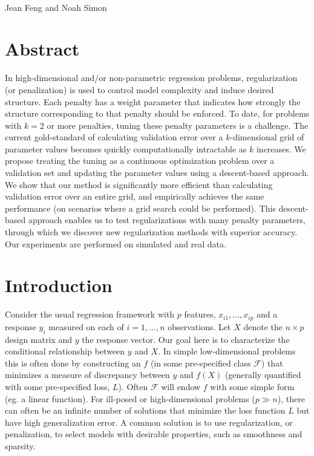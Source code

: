 \documentclass[10pt,letterpaper]{article}
\date{}
\begin{document}
\vspace*{0.35in}

\begin{flushleft}
{\Large
\textbf{}
}
\newline
\\
Jean Feng and Noah Simon
\\

\end{flushleft}
\section*{Abstract}
In high-dimensional and/or non-parametric regression problems, regularization (or penalization) is used to control model complexity and induce desired structure. Each penalty has a weight parameter that indicates how strongly the structure corresponding to that penalty should be enforced. To date, for problems with $k=2$ or more penalties, tuning these penalty parameters is a challenge. The current gold-standard of calculating validation error over a $k$-dimensional grid of parameter values becomes quickly computationally intractable as $k$ increases. We propose treating the tuning as a continuous optimization problem over a validation set and updating the parameter values using a descent-based approach. We show that our method is significantly more efficient than calculating validation error over an entire grid, and empirically achieves the same performance (on scenarios where a grid search could be performed). This descent-based approach enables us to test regularizations with many penalty parameters, through which we discover new regularization methods with superior accuracy. Our experiments are performed on simulated and real data.

\section{Introduction}

Consider the usual regression framework with $p$ features, $x_{i1},\ldots,x_{ip}$ and a response $y_i$ measured on each of $i=1,\ldots,n$ observations. Let $X$ denote the $n \times p$ design matrix and $y$ the response vector. Our goal here is to characterize the conditional relationship between $y$ and $X$. In simple low-dimensional problems this is often done by constructing an $f$ (in some pre-specified class $\mathcal{F}$) that minimizes a measure of discrepancy between $y$ and $f(X)$ (generally quantified with some pre-specified loss, $L$). Often $\mathcal{F}$ will endow $f$ with some simple form (eg. a linear function). For ill-posed or high-dimensional problems ($p \gg n$), there can often be an infinite number of solutions that minimize the loss function $L$ but have high generalization error. A common solution is to use regularization, or penalization, to select models with desirable properties, such as smoothness and sparsity.
\end{document}
